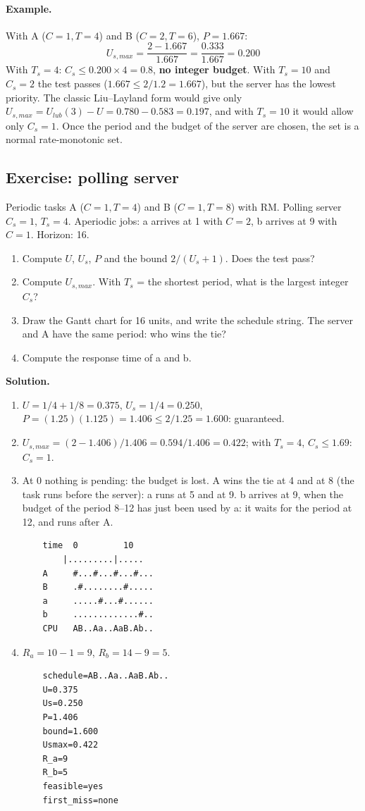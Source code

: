 \paragraph{Example.} With A ($C = 1, T = 4$) and B ($C = 2, T = 6$), $P = 1.667$:
\[
U_{s,max} = \frac{2 - 1.667}{1.667} = \frac{0.333}{1.667} = 0.200
\]
With $T_s = 4$: $C_s \le 0.200 \times 4 = 0.8$, \textbf{no integer budget}. With $T_s = 10$ and $C_s = 2$ the test passes ($1.667 \le 2/1.2 = 1.667$), but the server has the lowest priority. The classic Liu--Layland form would give only $U_{s,max} = U_{lub}(3) - U = 0.780 - 0.583 = 0.197$, and with $T_s = 10$ it would allow only $C_s = 1$. Once the period and the budget of the server are chosen, the set is a normal rate-monotonic set.

\subsection{Exercise: polling server}
Periodic tasks A ($C = 1, T = 4$) and B ($C = 1, T = 8$) with RM. Polling server $C_s = 1$, $T_s = 4$. Aperiodic jobs: a arrives at 1 with $C = 2$, b arrives at 9 with $C = 1$. Horizon: 16.
\begin{enumerate}
    \item Compute $U$, $U_s$, $P$ and the bound $2/(U_s + 1)$. Does the test pass?
    \item Compute $U_{s,max}$. With $T_s$ = the shortest period, what is the largest integer $C_s$?
    \item Draw the Gantt chart for 16 units, and write the schedule string. The server and A have the same period: who wins the tie?
    \item Compute the response time of a and b.
\end{enumerate}

\textbf{Solution.}
\begin{enumerate}
    \item $U = 1/4 + 1/8 = 0.375$, $U_s = 1/4 = 0.250$, $P = (1.25)(1.125) = 1.406 \le 2 / 1.25 = 1.600$: guaranteed.
    \item $U_{s,max} = (2 - 1.406) / 1.406 = 0.594 / 1.406 = 0.422$; with $T_s = 4$, $C_s \le 1.69$: $C_s = 1$.
    \item At 0 nothing is pending: the budget is lost. A wins the tie at 4 and at 8 (the task runs before the server): a runs at 5 and at 9. b arrives at 9, when the budget of the period 8--12 has just been used by a: it waits for the period at 12, and runs after A.
\begin{verbatim}
    time  0         10
        |.........|.....
    A     #...#...#...#...
    B     .#........#.....
    a     .....#...#......
    b     .............#..
    CPU   AB..Aa..AaB.Ab..
\end{verbatim}
    \item $R_a = 10 - 1 = 9$, $R_b = 14 - 9 = 5$.
\begin{verbatim}
    schedule=AB..Aa..AaB.Ab..
    U=0.375
    Us=0.250
    P=1.406
    bound=1.600
    Usmax=0.422
    R_a=9
    R_b=5
    feasible=yes
    first_miss=none
\end{verbatim}
\end{enumerate}

